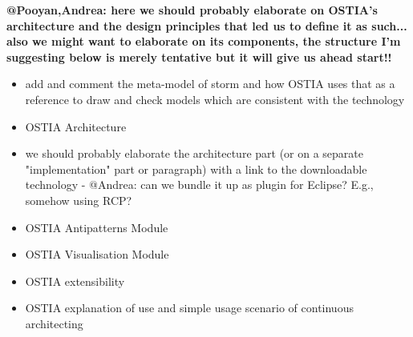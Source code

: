\textbf{@Pooyan,Andrea: here we should probably elaborate on OSTIA's architecture and the design principles that led us to define it as such... also we might want to elaborate on its components, the structure I'm suggesting below is merely tentative but it will give us ahead start!!}

\begin{itemize}
\item add and comment the meta-model of storm and how OSTIA uses that as a reference to draw and check models which are consistent with the technology
\item OSTIA Architecture 
\item we should probably elaborate the architecture part (or on a separate "implementation" part or paragraph) with a link to the downloadable technology - @Andrea: can we bundle it up as plugin for Eclipse? E.g., somehow using RCP?
\item OSTIA Antipatterns Module
\item OSTIA Visualisation Module 
\item OSTIA extensibility
\item OSTIA explanation of use and simple usage scenario of continuous architecting
\end{itemize}